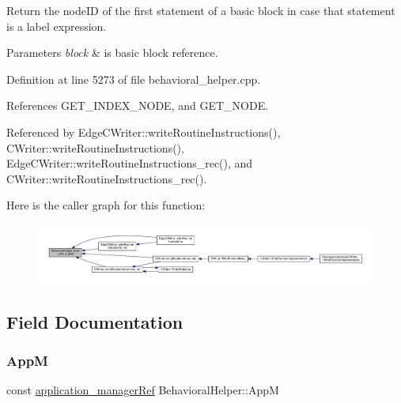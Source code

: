 Return the node\+ID of the first statement of a basic block in case that statement is a label expression. 


\begin{DoxyParams}{Parameters}
{\em block} & is basic block reference. \\
\hline
\end{DoxyParams}


Definition at line 5273 of file behavioral\+\_\+helper.\+cpp.



References G\+E\+T\+\_\+\+I\+N\+D\+E\+X\+\_\+\+N\+O\+DE, and G\+E\+T\+\_\+\+N\+O\+DE.



Referenced by Edge\+C\+Writer\+::write\+Routine\+Instructions(), C\+Writer\+::write\+Routine\+Instructions(), Edge\+C\+Writer\+::write\+Routine\+Instructions\+\_\+rec(), and C\+Writer\+::write\+Routine\+Instructions\+\_\+rec().

Here is the caller graph for this function\+:
\nopagebreak
\begin{figure}[H]
\begin{center}
\leavevmode
\includegraphics[width=350pt]{dd/db2/classBehavioralHelper_a2d87c9daa2632ea995500bb7d5c14efd_icgraph}
\end{center}
\end{figure}


\subsection{Field Documentation}
\mbox{\label{classBehavioralHelper_a5709449513c415e3f005344f354e6760}} 
\subsubsection{\texorpdfstring{AppM}{AppM}}
{\footnotesize\ttfamily const \hyperlink{application__manager_8hpp_a04ccad4e5ee401e8934306672082c180}{application\+\_\+manager\+Ref} Behavioral\+Helper\+::\+AppM\hspace{0.3cm}{\ttfamily [protected]}}



